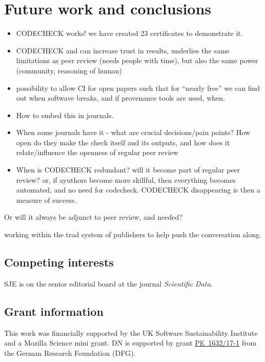 \documentclass[12pt]{article}
\begin{document}
\section*{Future work and conclusions}\label{future-work-and-conclusions}

\begin{itemize}
\item
  CODECHECK works! we have created 23 certificates to demonstrate it.
\item 
  CODECHECK and can increase trust in results, underlies the same
  limitations as peer review (needs people with time), but also the same
  power (community, reasoning of human)
\item
  possibility to allow CI for open papers such that for ``nearly free''
  we can find out when softwave breaks, and if provenance tools are
  used, when.
\item
  How to embed this in journals.
\item
  When some journals have it - what are crucial decisions/pain points?
  How open do they make the check itself and its outputs, and how does it
  relate/influence the openness of regular peer review
\item
  When is CODECHECK redundant? will it become part of regular peer
  review? or, if ayuthors become more skillful, then everything becomes
  automated, and no need for codecheck. CODECHECK disappearing is then a
  measure of success.
\end{itemize}

Or will it always be adjunct to peer review, and needed?

working within the trad system of publishers to help push the
conversation along.




\subsection*{Competing interests}

SJE is on the senior editorial board at the journal \emph{Scientific
Data}.

\subsection*{Grant information}

This work was financially supported by the UK Software
Sustainability Institute and a Mozilla Science mini grant.
DN is supported by grant
\href{https://gepris.dfg.de/gepris/projekt/415851837}{PE~1632/17-1}
from the German Research Foundation (DFG).
\end{document}
